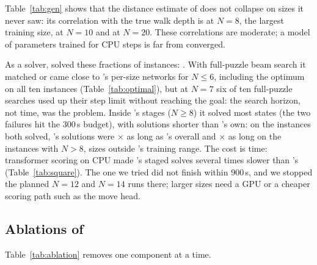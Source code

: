 Table~\ref{tab:gen} shows that the distance estimate of \FiveA does not collapse on sizes it never
saw: its correlation with the true walk depth is \FiveACorrEight{} at $N=8$, the largest training
size, \FiveACorrTen{} at $N=10$ and \FiveACorrTwenty{} at $N=20$. These correlations are moderate;
a model of \FiveAParams{} parameters trained for \FiveASteps{} CPU steps is far from converged.

As a solver, \FiveA solved these fractions of instances: \FiveACoverage{}. With full-puzzle beam search it matched or came close
to \Mfour's per-size networks for $N\le6$, including the optimum on all ten  instances
(Table~\ref{tab:optimal}), but at $N=7$ six of ten full-puzzle searches used up their step limit
without reaching the goal: the search horizon, not time, was the problem. Inside
\FiveB's stages ($N\ge8$) it solved most states (the two  failures hit the 300\,s budget), with solutions shorter than \FiveB's own: on the
\PairedFiveAN{} instances both solved, \FiveB's solutions were \RatioFiveBFiveA$\times$ as long as
\FiveA's overall and \RatioFiveBFiveAUnseen$\times$ as long on the \PairedFiveAUnseenN{} instances
with $N>8$, sizes outside \FiveA's training range. The cost is time: transformer scoring on CPU
made \FiveA's staged solves several times slower than \FiveB's (Table~\ref{tab:square}). The one
 we tried did not finish within 900\,s, and we stopped the planned $N=12$ and $N=14$ runs
there; larger sizes need a GPU or a cheaper scoring path such as the move head.

\subsection{Ablations of \FiveB}
\label{sec:ablations}

\begin{table}[t]
\caption{Ablations of \FiveB, removing one component at a time: macro actions, exact small stages,
the restriction of late center stages to pure-center commutators, the tables-only corner heuristic,
and the coarse abstraction tables (corners then use the MLP alone). Each cell: solved / tried, mean
HTM over solved states, mean seconds per state (failures included in time). Square: 5 states per size, 600\,s budget; cube: 2 states per
size, 300\,s budget. The same instances as Tables~\ref{tab:square} and \ref{tab:cube}.}
\label{tab:ablation}
\small

\end{table}

Table~\ref{tab:ablation} removes one component at a time.

